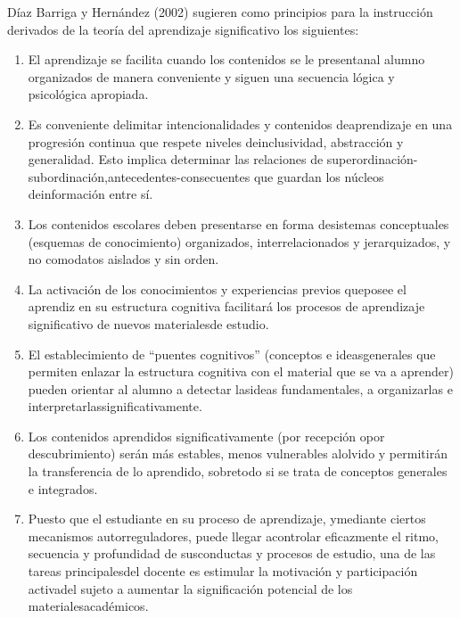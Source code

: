 \documentclass[12pt]{report}
\newcounter{it}
\theoremstyle{largebreak}
\begin{document}
    Díaz Barriga y Hernández (2002) sugieren como principios para la instrucción
    derivados de la teoría del aprendizaje significativo los siguientes:
    \begin{enumerate}
        \item El aprendizaje se facilita cuando los contenidos se le presentanal alumno
        organizados de manera conveniente y siguen una secuencia lógica y psicológica
        apropiada.
        \item Es conveniente delimitar intencionalidades y contenidos deaprendizaje en una
        progresión continua que respete niveles deinclusividad, abstracción y generalidad.
        Esto
        implica
        determinar
        las
        relaciones
        de
        superordinación-
        subordinación,antecedentes-consecuentes que guardan los núcleos deinformación
        entre sí.
        \item Los contenidos escolares deben presentarse en forma desistemas conceptuales
        (esquemas de conocimiento) organizados, interrelacionados y jerarquizados, y no
        comodatos aislados y sin orden.
        \item La activación de los conocimientos y experiencias previos queposee el aprendiz
        en su estructura cognitiva facilitará los procesos de aprendizaje significativo de nuevos
        materialesde estudio.
        \item El establecimiento de “puentes cognitivos” (conceptos e ideasgenerales que
        permiten enlazar la estructura cognitiva con el material que se va a aprender) pueden
        orientar al alumno a detectar lasideas fundamentales, a organizarlas e
        interpretarlassignificativamente.
        \item Los contenidos aprendidos significativamente (por recepción opor
        descubrimiento) serán más estables, menos vulnerables alolvido y permitirán la
        transferencia de lo aprendido, sobretodo si se trata de conceptos generales e
        integrados.
        \item Puesto que el estudiante en su proceso de aprendizaje, ymediante ciertos
        mecanismos autorreguladores, puede llegar acontrolar eficazmente el ritmo, secuencia
        y profundidad de susconductas y procesos de estudio, una de las tareas principalesdel
        docente es estimular la motivación y participación activadel sujeto a aumentar la
        significación potencial de los materialesacadémicos.
    \end{enumerate}
\end{document}
